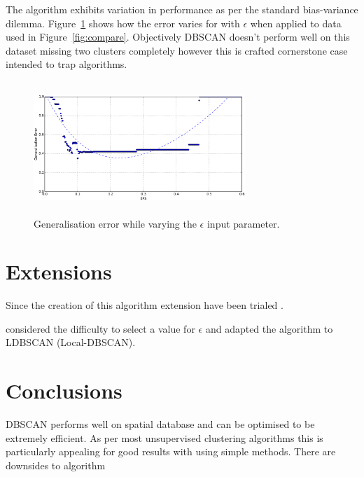 \documentclass{ecsarticle}     %
\begin{document}
The algorithm exhibits variation in performance as per the standard bias-variance dilemma.
Figure~\ref{fig:error} shows how the error varies for with $\epsilon$ when applied to data used in Figure~\ref{fig:compare}.
Objectively DBSCAN doesn't perform well on this dataset missing two clusters completely however this is crafted cornerstone case intended to trap algorithms.

\begin{figure}[ht]
   \centering
    \includegraphics[height = 5cm,width = 8cm]{error.pdf}
   \caption{Generalisation error while varying the $\epsilon$ input parameter.}
   \label{fig:error}
\end{figure}




\section{Extensions}
Since the creation of this algorithm extension have been trialed . 

\cite{lian07ldbscan} considered the difficulty to select a value for $\epsilon$ and adapted the algorithm to LDBSCAN (Local-DBSCAN).

\section{Conclusions}
DBSCAN performs well on spatial database and can be optimised to be extremely efficient.
As per most unsupervised clustering algorithms this is particularly appealing for good results with using simple methods. 
There are downsides to algorithm



\end{document}
